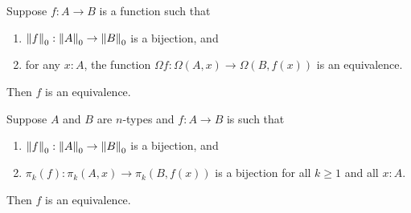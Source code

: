 \documentclass[hott-all.tex]{subfiles}
\begin{document}
% 
% 
\begin{cor}
  Suppose $f:A\to B$ is a function such that
  \begin{enumerate}
  \item $\trunc0 f : \trunc0 A \to \trunc0 B$ is a bijection, and
  \item for any $x:A$, the function $\Omega f : \Omega(A,x) \to \Omega(B,f(x))$ is an equivalence.
  \end{enumerate}
  Then $f$ is an equivalence.
\end{cor}
% 
% 
\begin{thm}
  Suppose $A$ and $B$ are $n$-types and $f:A\to B$ is such that
  \begin{enumerate}
  \item $\trunc0f:\trunc0A \to \trunc0B$ is a bijection, and
  \item $\pi_k(f):\pi_k(A,x) \to \pi_k(B,f(x))$ is a bijection for all $k\ge 1$ and all $x:A$.
  \end{enumerate}
  Then $f$ is an equivalence.
\end{thm}
\end{document}
